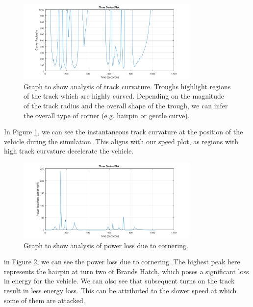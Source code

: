 \documentclass[11pt]{article}
\numberwithin{equation}{section}
\begin{document}
\begin{figure}[H]
    \centering
    \includegraphics[width = 0.8\textwidth]{./img/trackRadius2.png}
    \caption{Graph to show analysis of track curvature. Troughs highlight regions of the track which are highly curved. Depending on the magnitude of the track radius and the overall shape of the trough, we can infer the overall type of corner (e.g. hairpin or gentle curve).}
    \label{trackCurve}
\end{figure}
In Figure \ref{trackCurve}, we can see the instantaneous track curvature at the position of the vehicle during the simulation. This aligns with our speed plot, as regions with high track curvature decelerate the vehicle. 
\begin{figure}[H]
    \centering
    \includegraphics[width = 0.8\textwidth]{./img/powerLossCornering.png}
    \caption{Graph to show analysis of power loss due to cornering. }
    \label{powerLoss}
\end{figure}
in Figure \ref{powerLoss}, we can see the power loss due to cornering. The highest peak here represents the hairpin at turn two of Brands Hatch, which poses a significant loss in energy for the vehicle. We can also see that subsequent turns on the track result in less energy loss. This can be attributed to the slower speed at which some of them are attacked. 
\end{document}
